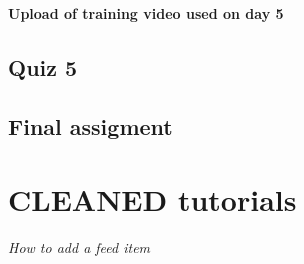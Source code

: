 \documentclass[
]{book}
\begin{document}
\textbf{Upload of training video used on day 5}

\hypertarget{quiz-5}{%
\section{Quiz 5}\label{quiz-5}}

\hypertarget{final-assigment}{%
\section{Final assigment}\label{final-assigment}}

\hypertarget{cleaned-tutorials}{%
\chapter*{CLEANED tutorials}\label{cleaned-tutorials}}

\emph{How to add a feed item}

  
\end{document}
